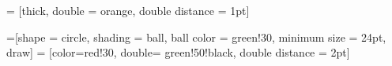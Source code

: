 \documentclass[]{article}
\begin{document}
	
= [thick,%
                        double          = orange,%
                        double distance = 1pt] 
\begin{center}

    =[shape        = circle,
                             shading      = ball,
                             ball color   = green!30,
                             minimum size = 24pt,
                             draw]
    \SetVertexLabel
    = [color=red!30,
                            double= green!50!black,
                            double distance = 2pt] 



\end{center}
\end{document}
